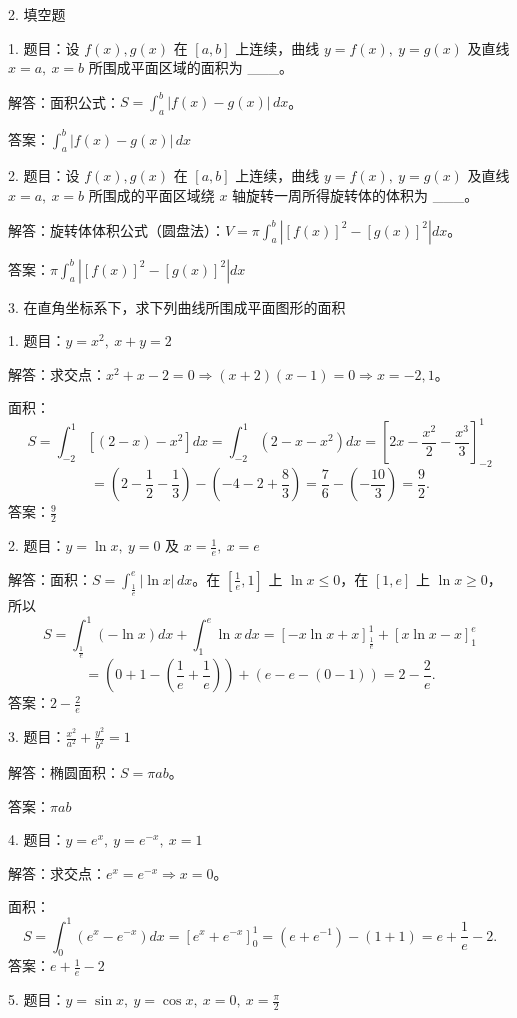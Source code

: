 2. 填空题

1. 题目：设 \(f(x),g(x)\) 在 \([a,b]\) 上连续，曲线 \(y=f(x),\ y=g(x)\) 及直线 \(x=a,\ x=b\) 所围成平面区域的面积为 \_\_\_。

解答：面积公式：\(S=\int_{a}^{b}|f(x)-g(x)|\,dx\)。

答案：\(\int_{a}^{b}|f(x)-g(x)|\,dx\)

2. 题目：设 \(f(x),g(x)\) 在 \([a,b]\) 上连续，曲线 \(y=f(x),\ y=g(x)\) 及直线 \(x=a,\ x=b\) 所围成的平面区域绕 \(x\) 轴旋转一周所得旋转体的体积为 \_\_\_。

解答：旋转体体积公式（圆盘法）：\(V=\pi\int_{a}^{b}\left|[f(x)]^{2}-[g(x)]^{2}\right|dx\)。

答案：\(\pi\int_{a}^{b}\left|[f(x)]^{2}-[g(x)]^{2}\right|dx\)

3. 在直角坐标系下，求下列曲线所围成平面图形的面积

1. 题目：\(y=x^{2},\ x+y=2\)

解答：求交点：\(x^{2}+x-2=0\Rightarrow(x+2)(x-1)=0\Rightarrow x=-2,1\)。

面积：
\[ S=\int_{-2}^{1}\left[(2-x)-x^{2}\right]dx=\int_{-2}^{1}(2-x-x^{2})dx=\left[2x-\frac{x^{2}}{2}-\frac{x^{3}}{3}\right]_{-2}^{1} \]
\[ =\left(2-\frac{1}{2}-\frac{1}{3}\right)-\left(-4-2+\frac{8}{3}\right)=\frac{7}{6}-\left(-\frac{10}{3}\right)=\frac{9}{2}. \]
答案：\(\frac{9}{2}\)

2. 题目：\(y=\ln x,\ y=0\) 及 \(x=\frac{1}{e},\ x=e\)

解答：面积：\(S=\int_{\frac{1}{e}}^{e}|\ln x|\,dx\)。在 \(\left[\frac{1}{e},1\right]\) 上 \(\ln x\le0\)，在 \([1,e]\) 上 \(\ln x\ge0\)，所以
\[ S=\int_{\frac{1}{e}}^{1}(-\ln x)dx+\int_{1}^{e}\ln x\,dx=\left[-x\ln x+x\right]_{\frac{1}{e}}^{1}+\left[x\ln x-x\right]_{1}^{e} \]
\[ =\left(0+1-\left(\frac{1}{e}+\frac{1}{e}\right)\right)+(e-e-(0-1))=2-\frac{2}{e}. \]
答案：\(2-\frac{2}{e}\)

3. 题目：\(\frac{x^{2}}{a^{2}}+\frac{y^{2}}{b^{2}}=1\)

解答：椭圆面积：\(S=\pi ab\)。

答案：\(\pi ab\)

4. 题目：\(y=e^{x},\ y=e^{-x},\ x=1\)

解答：求交点：\(e^{x}=e^{-x}\Rightarrow x=0\)。

面积：
\[ S=\int_{0}^{1}(e^{x}-e^{-x})dx=\left[e^{x}+e^{-x}\right]_{0}^{1}=(e+e^{-1})-(1+1)=e+\frac{1}{e}-2. \]
答案：\(e+\frac{1}{e}-2\)

5. 题目：\(y=\sin x,\ y=\cos x,\ x=0,\ x=\frac{\pi}{2}\)

